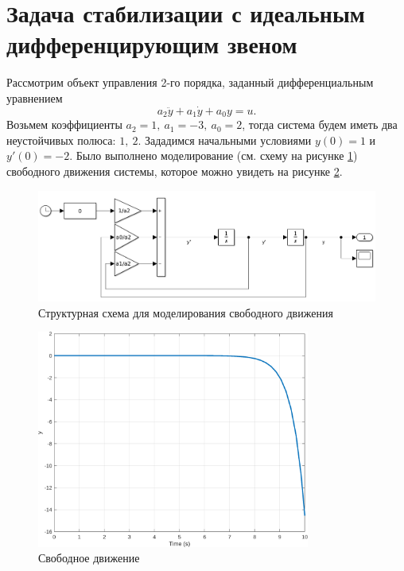 \section{Задача стабилизации с идеальным дифференцирующим звеном}

Рассмотрим объект управления 2-го порядка, заданный дифференциальным уравнением
\begin{equation*}
    a_2\ddot y+a_1\dot y + a_0 y=u. 
\end{equation*}
Возьмем коэффициенты $a_2=1,\ a_1=-3,\ a_0=2$, тогда система будем иметь два
неустойчивых полюса: $1,\ 2$. Зададимся начальными условиями $y(0)=1$ и $y'(0)=-2$.
Было выполнено моделирование (см. схему на рисунке \ref{fig:task_1_xls}) свободного движения системы, которое можно увидеть на
рисунке \ref{fig:task_1_out}.
\begin{figure}[H]
    \centering
    \includegraphics[width=1\textwidth]{figs/task_1_slx.png}
    \caption{Структурная схема для моделирования свободного движения}
    \label{fig:task_1_xls}
\end{figure}
\begin{figure}[H]
    \centering
    \includegraphics[width=0.8\textwidth]{figs/task_1_out.png}
    \caption{Свободное движение}
    \label{fig:task_1_out}
\end{figure}

